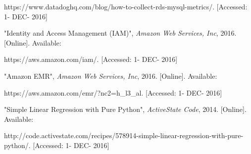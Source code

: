\begin{thebibliography}{10}
https://www.datadoghq.com/blog/how-to-collect-rds-mysql-metrics/. [Accessed: 1- DEC- 2016]
    
    "Identity and Access Management (IAM)", \textit{Amazon Web Services, Inc}, 2016. [Online]. Available:
    
https://aws.amazon.com/iam/. [Accessed: 1- DEC- 2016]
  
 	"Amazon EMR", \textit{Amazon Web Services, Inc}, 2016. [Online]. Available:
    
https://aws.amazon.com/emr/?nc2=h\_l3\_al. [Accessed: 1- DEC- 2016]

	"Simple Linear Regression with Pure Python", \textit{ActiveState Code}, 2014. [Online]. Available:
    
http://code.activestate.com/recipes/578914-simple-linear-regression-with-pure-python/. [Accessed: 1- DEC- 2016]

\end{thebibliography}